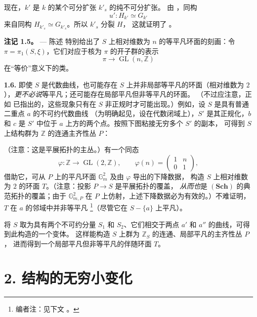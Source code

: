 现在，\(k'\) 是 \(k\) 的某个可分扩张 \(k'_s\) 的纯不可分扩张。
由 ，同构
\[
  u':H_{k'}\simeq G_{k'}
\]
来自同构 \(H_{k'_s}\simeq G_{k'_s}\)。所以 \(k'_s\) 分裂 \(H\)，
这就证明了 。

\medskip
\noindent{}%
\textbf{注记 1.5。} ---
陈述  特别给出了 \(S\) 上相对维数为
\(n\) 的等平凡环面的刻画：令 \(\pi=\pi_1(S,\xi)\)，它们对应于核为
\(\pi\) 的开子群的表示
\[
  \pi\longrightarrow\operatorname{GL}(n,\mathbb Z)
\]
在“等价”意义下的类。

\medskip
\noindent{}\textbf{1.6.}
即使 \(S\) 是代数曲线，也可能存在 \(S\) 上并非局部等平凡的环面（相对维数为
\(2\)），\emph{更不必说}等平凡；还可能存在局部平凡但非等平凡的环面。
（不过应注意，正如  已指出的，这些现象只有在
\(S\) 非正规时才可能出现。）例如，设 \(S\) 是具有普通二重点 \(a\) 的不可约代数曲线
（为明确起见，设在代数闭域上），\(S'\) 是其正规化，\(b\) 和 \(c\) 是
\(S'\) 中位于 \(a\) 上方的两个点。按照下图粘接无穷多个 \(S'\) 的副本，
可得到 \(S\) 上结构群为 \(\mathbb Z\) 的连通主齐性丛 \(P\)：
\begin{center}
  
\end{center}
（注意：这是平展拓扑的主丛。）有一个同态
\[
  \varphi:\mathbb Z\longrightarrow\operatorname{GL}(2,\mathbb Z),
  \qquad
  \varphi(n)=
  \begin{pmatrix}
    1 & n\\
    0 & 1
  \end{pmatrix},
\]
借助它，可从 \(P\) 上的平凡环面 \(\mathbb G_m^2\) 及由 \(\varphi\) 导出的下降数据，
构造 \(S\) 上相对维数为 \(2\) 的环面 \(T\)。（注意：投影 \(P\to S\) 是平展拓扑的覆盖，
\emph{从而也}是 \((\mathbf{Sch})\) 的典范拓扑的覆盖；由于 \(\mathbb G_{m,P}^2\)
在 \(P\) 上仿射，上述下降数据必为有效的。）不难证明，\(T\) 在 \(a\) 的邻域中并非等平凡
\footnote{编者注：见下文 。}（尽管它在 \(S-\{a\}\) 上平凡）。

将 \(S\) 取为具有两个不可约分量 \(S_1\) 和 \(S_2\)、它们相交于两点
\(a'\) 和 \(a''\) 的曲线，可得到此构造的一个变体。
这样能构造 \(S\) 上群为 \(\mathbb Z_S\) 的连通、局部平凡的主齐性丛 \(P\)，
进而得到一个局部平凡但非等平凡的伴随环面 \(T\)。

\section*{2. 结构的无穷小变化}

